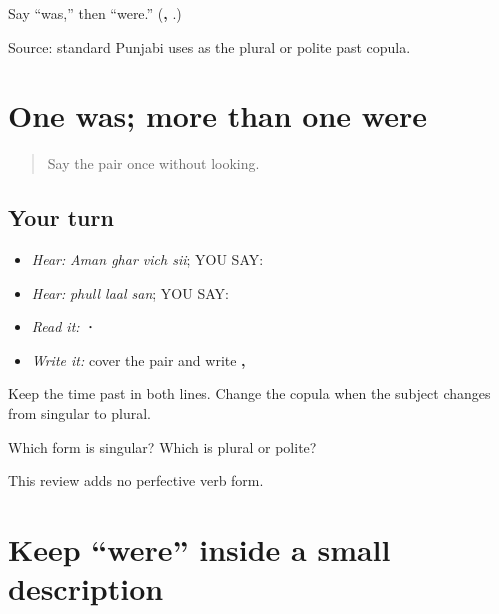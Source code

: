 \begin{tcolorbox}[breakable,colback=teal!4,colframe=teal!35!black,title={Before you move on}]
Say “was,” then “were.” (\textbf{, }.)

Source: standard Punjabi uses \textbf{} as the plural or polite past copula.
\end{tcolorbox}
\section[\texorpdfstring{\pa{ਸੀ} · \pa{ਸਨ} (sii / san)}{ਸੀ · ਸਨ (sii / san)}]{One was; more than one were}

\label{lesson:PA-C187-si-san-contrast}



\begin{quote}
Say the pair once without looking.
\end{quote}

\subsection*{Your turn}
\begin{itemize}
\raggedright
  \item \emph{Hear:} \emph{Aman ghar vich sii}; YOU SAY: \textbf{   }
  \item \emph{Hear:} \emph{phull laal san}; YOU SAY: \textbf{  }
  \item \emph{Read it:} \textbf{ · }
  \item \emph{Write it:} cover the pair and write \textbf{, }
\end{itemize}

Keep the time past in both lines. Change the copula when the subject changes from singular to plural.

\begin{tcolorbox}[breakable,colback=teal!4,colframe=teal!35!black,title={Before you move on}]
Which form is singular? Which is plural or polite?

This review adds no perfective verb form.
\end{tcolorbox}
\section[\texorpdfstring{\pa{ਫੁੱਲ} \pa{ਲਾਲ} \pa{ਸਨ} (phull laal san)}{ਫੁੱਲ ਲਾਲ ਸਨ (phull laal san)}]{Keep “were” inside a small description}

